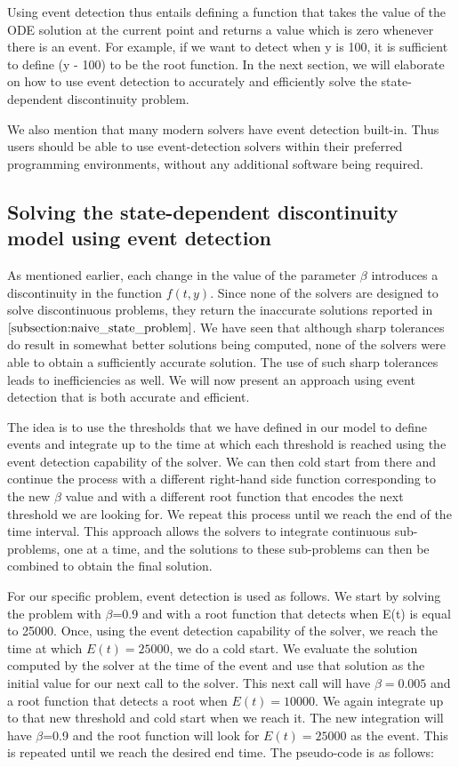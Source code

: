 Using event detection thus entails defining a function that takes the value of the ODE solution at the current point and returns a value which is zero whenever there is an event. For example, if we want to detect when y is 100, it is sufficient to define (y - 100) to be the root function. In the next section, we will elaborate on how to use event detection to accurately and efficiently solve the state-dependent discontinuity problem.

We also mention that many modern solvers have event detection built-in. Thus users should be able to use event-detection solvers within their preferred programming environments, without any additional software being required.

\subsection{Solving the state-dependent discontinuity model using event detection}
\label{subsection:state_with_event_detection}
As mentioned earlier, each change in the value of the parameter $\beta$ introduces a discontinuity in the function $f(t,y)$. Since none of the solvers are designed to solve discontinuous problems, they return the inaccurate solutions reported in $\ref{subsection:naive_state_problem}$. We have seen that although sharp tolerances do result in somewhat better solutions being computed, none of the solvers were able to obtain a sufficiently accurate solution. The use of such sharp tolerances leads to inefficiencies as well. We will now present an approach using event detection that is both accurate and efficient.

The idea is to use the thresholds that we have defined in our model to define events and integrate up to the time at which each threshold is reached using the event detection capability of the solver. We can then cold start from there and continue the process with a different right-hand side function corresponding to the new $\beta$ value and with a different root function that encodes the next threshold we are looking for. We repeat this process until we reach the end of the time interval. This approach allows the solvers to integrate continuous sub-problems, one at a time, and the solutions to these sub-problems can then be combined to obtain the final solution.

For our specific problem, event detection is used as follows.
We start by solving the problem with $\beta$=0.9 and with a root function that detects when E(t) is equal to 25000. Once, using the event detection capability of the solver, we reach the time at which $E(t)=25000$, we do a cold start. We evaluate the solution computed by the solver at the time of the event and use that solution as the initial value for our next call to the solver. This next call will have $\beta= 0.005$ and a root function that detects a root when $E(t)=10000$. We again integrate up to that new threshold and cold start when we reach it. The new integration will have $\beta$=0.9 and the root function will look for $E(t)=25000$ as the event. This is repeated until we reach the desired end time. The pseudo-code is as follows:


